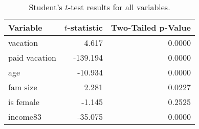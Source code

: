 \documentclass{article}
\begin{document}
    \setlength{\extrarowheight}{3pt}
    \begin{table}[h]
    \centering
    \hspace*{-1.5cm}
    \begin{tabular}{l|r|r}
      Variable      & $t$-statistic & Two-Tailed p-Value \\ \hline \hline
      vacation      &         4.617 & 0.0000             \\ \hline
      paid vacation &      -139.194 & 0.0000             \\ \hline
      age           &       -10.934 & 0.0000             \\ \hline
      fam size      &         2.281 & 0.0227             \\ \hline
      is female     &        -1.145 & 0.2525             \\ \hline
      income83      &       -35.075 & 0.0000
    \end{tabular}
    \hspace*{-1.5cm}
    \caption{Student's $t$-test results for all variables.}
    \end{table}
\end{document}
